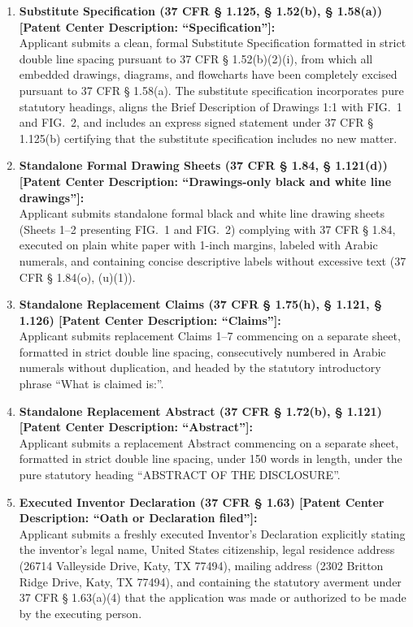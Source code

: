 \documentclass[11pt,letterpaper]{article}
\begin{document}
\begin{enumerate}[leftmargin=*]
    \item \textbf{Substitute Specification (37 CFR \S{} 1.125, \S{} 1.52(b), \S{} 1.58(a)) [Patent Center Description: ``Specification'']:} \\
    Applicant submits a clean, formal Substitute Specification formatted in strict double line spacing pursuant to 37 CFR \S{} 1.52(b)(2)(i), from which all embedded drawings, diagrams, and flowcharts have been completely excised pursuant to 37 CFR \S{} 1.58(a). The substitute specification incorporates pure statutory headings, aligns the Brief Description of Drawings 1:1 with FIG.~1 and FIG.~2, and includes an express signed statement under 37 CFR \S{} 1.125(b) certifying that the substitute specification includes no new matter.

    \item \textbf{Standalone Formal Drawing Sheets (37 CFR \S{} 1.84, \S{} 1.121(d)) [Patent Center Description: ``Drawings-only black and white line drawings'']:} \\
    Applicant submits standalone formal black and white line drawing sheets (Sheets 1--2 presenting FIG.~1 and FIG.~2) complying with 37 CFR \S{} 1.84, executed on plain white paper with 1-inch margins, labeled with Arabic numerals, and containing concise descriptive labels without excessive text (37 CFR \S{} 1.84(o), (u)(1)).

    \item \textbf{Standalone Replacement Claims (37 CFR \S{} 1.75(h), \S{} 1.121, \S{} 1.126) [Patent Center Description: ``Claims'']:} \\
    Applicant submits replacement Claims 1--7 commencing on a separate sheet, formatted in strict double line spacing, consecutively numbered in Arabic numerals without duplication, and headed by the statutory introductory phrase ``What is claimed is:''.

    \item \textbf{Standalone Replacement Abstract (37 CFR \S{} 1.72(b), \S{} 1.121) [Patent Center Description: ``Abstract'']:} \\
    Applicant submits a replacement Abstract commencing on a separate sheet, formatted in strict double line spacing, under 150 words in length, under the pure statutory heading ``ABSTRACT OF THE DISCLOSURE''.

    \item \textbf{Executed Inventor Declaration (37 CFR \S{} 1.63) [Patent Center Description: ``Oath or Declaration filed'']:} \\
    Applicant submits a freshly executed Inventor's Declaration explicitly stating the inventor's legal name, United States citizenship, legal residence address (26714 Valleyside Drive, Katy, TX 77494), mailing address (2302 Britton Ridge Drive, Katy, TX 77494), and containing the statutory averment under 37 CFR \S{} 1.63(a)(4) that the application was made or authorized to be made by the executing person.


\end{enumerate}
\end{document}
